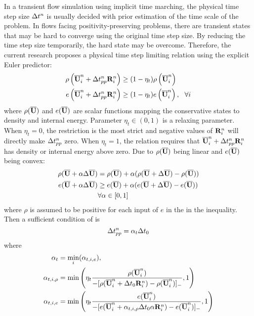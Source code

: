 In a transient flow simulation using implicit
time marching, the
physical time step size $\mathrm\Delta t^n$
is usually decided with prior estimation
of the time scale of the problem.
In flows facing positivity-preserving problems,
there are transient states that may be hard
to converge using the original time step size.
By reducing the time step size temporarily,
the hard state may be overcome.
Therefore, the current research
proposes a physical time step limiting relation using
the explicit Euler predictor:
\begin{equation}
    \label{eq:ppLimitDt}
    \begin{aligned}
        \rho\left(\overline{\mathbf{U}}_i^n + \mathrm\Delta t^{n}_{pp}\mathbf{R}_i^n\right)
         & \geq
        (1- \eta_t)
        \rho\left(\overline{\mathbf{U}}_i^n\right) \\
        e\left(\overline{\mathbf{U}}_i^n + \mathrm\Delta t^{n}_{pp}\mathbf{R}_i^n\right)
         & \geq
        (1- \eta_t)
        e\left(\overline{\mathbf{U}}_i^n\right), \ \ \forall i
    \end{aligned}
\end{equation}
where $\rho(\overline{\mathbf{U}})$ and $e(\overline{\mathbf{U}})$ are scalar functions
mapping the conservative states to density and internal energy.
Parameter $\eta_t\in(0,1)$ is a relaxing parameter.
When $\eta_t=0$, the restriction is the most strict and
negative values of $\mathbf{R}_i^n$ will directly make $\mathrm\Delta t^n_{pp}$
zero.
When  $\eta_t=1$, the relation requires that $\overline{\mathbf{U}}_i^n + \mathrm\Delta t^{n}_{pp}\mathbf{R}_i^n$
has density or internal energy above zero.
Due to $\rho(\overline{\mathbf{U}})$ being linear and $e(\overline{\mathbf{U}})$ being convex:
\begin{equation}
    \begin{aligned}
        \rho(\overline{\mathbf{U}} + \alpha \mathrm\Delta \overline{\mathbf{U}}) & = \rho(\overline{\mathbf{U}}) + \alpha (\rho(\overline{\mathbf{U}} + \mathrm\Delta \overline{\mathbf{U}}) - \rho(\overline{\mathbf{U}}))\\
        e(\overline{\mathbf{U}} + \alpha\mathrm\Delta \overline{\mathbf{U}}) & \geq e(\overline{\mathbf{U}}) + \alpha(e(\overline{\mathbf{U}} + \mathrm\Delta \overline{\mathbf{U}}) - e(\overline{\mathbf{U}}))    \\
        & \forall \alpha \in [0,1]
    \end{aligned}
\end{equation}
where $\rho$ is assumed to be positive for each input of $e$ in
the in the inequality. 
Then a sufficient condition of  is
\begin{equation}
    \mathrm\Delta t^n_{pp} = \alpha_t \mathrm\Delta t_0 
\end{equation}
where
\begin{equation}
    \begin{aligned}
        \alpha_t     & = \min_i(\alpha_{t,i,e}), \\
        \alpha_{t,i,\rho} & = \min\left(
        \eta_t\frac{\rho(\overline{\mathbf{U}}_i^n)}{-[\rho(\overline{\mathbf{U}}_i^n+\mathrm\Delta t_0 \mathbf{R}_i^n)-\rho(\overline{\mathbf{U}}_i^n)]_-},
        1
        \right)\\
        \alpha_{t,i,e} & = \min\left(
        \eta_t\frac{e(\overline{\mathbf{U}}_i^n)}{-[e(\overline{\mathbf{U}}_i^n+\alpha_{t,i,\rho}\mathrm\Delta t_0\alpha \mathbf{R}_i^n)-e(\overline{\mathbf{U}}_i^n)]_-},
        1
        \right)
    \end{aligned}
\end{equation}
